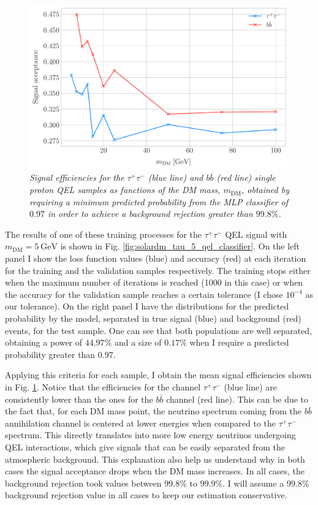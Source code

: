 \begin{figure}[t]
	\centering
	\includegraphics[width=0.9\linewidth]{Images/DM_Analysis/solardm_qel_signal_acceptance.pdf}
	\caption{\textit{Signal efficiencies for the $\tau^{+} \tau^{-}$ (blue line) and $b\bar{b}$ (red line) single proton QEL samples as functions of the DM mass, $m_{\mathrm{DM}}$, obtained by requiring a minimum predicted probability from the MLP classifier of $0.97$ in order to achieve a background rejection greater than $99.8\%$.}}
	\label{fig:solardm_qel_signal_acceptance}
\end{figure}

The results of one of these training processes for the $\tau^{+}\tau^{-}$ QEL signal with $m_{\mathrm{DM}} = 5 \ \mathrm{GeV}$ is shown in Fig. \ref{fig:solardm_tau_5_qel_classifier}. On the left panel I show the loss function values (blue) and accuracy (red) at each iteration for the training and the validation samples respectively. The training stops either when the maximum number of iterations is reached (1000 in this case) or when the accuracy for the validation sample reaches a certain tolerance (I chose $10^{-4}$ as our tolerance). On the right panel I have the distributions for the predicted probability by the model, separated in true signal (blue) and background (red) events, for the test sample. One can see that both populations are well separated, obtaining a power of $44.97\%$ and a size of $0.17\%$ when I require a predicted probability greater than $0.97$.

Applying this criteria for each sample, I obtain the mean signal efficiencies shown in Fig. \ref{fig:solardm_qel_signal_acceptance}. Notice that the efficiencies for the  channel $\tau^{+}\tau^{-}$ (blue line) are consistently lower than the ones for the $b\bar{b}$ channel (red line). This can be due to the fact that, for each DM mass point, the neutrino spectrum coming from the $b\bar{b}$ annihilation channel is centered at lower energies when compared to the $\tau^{+}\tau^{-}$ spectrum. This directly translates into more low energy neutrinos undergoing QEL interactions, which give signals that can be easily separated from the atmospheric background. This explanation also help us understand why in both cases the signal acceptance drops when the DM mass increases. In all cases, the background rejection took values between $99.8\%$ to $99.9\%$. I will assume a $99.8\%$ background rejection value in all cases to keep our estimation conservative.

